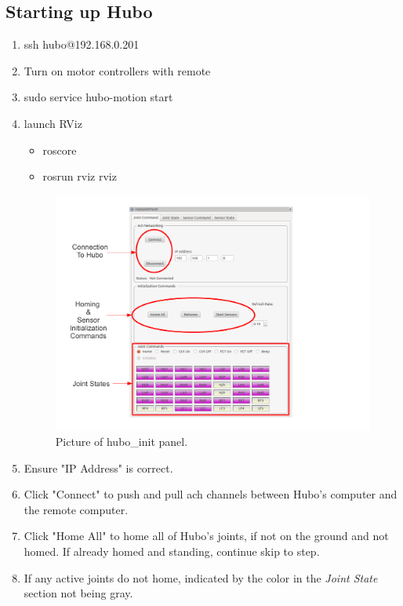 \documentclass[letterpaper, 10 pt]{report}
\begin{document}
\subsection*{Starting up Hubo}
\begin{enumerate}
  \item ssh hubo@192.168.0.201
  \item Turn on motor controllers with remote
  \item sudo service hubo-motion start
  \item launch RViz
    \begin{itemize}
    	  \item roscore
    	  \item rosrun rviz rviz
    \end{itemize}
  \begin{figure}[h]
    \centering
    \includegraphics[width=15.0cm]{resources/hubo-init.pdf}
    \caption{Picture of hubo\_init panel.}
    \label{fig:hubo-init-image}
  \end{figure}
  \item Ensure "IP Address" is correct.
  \item Click "Connect" to push and pull ach channels between Hubo's computer and the remote computer.
  \item Click "Home All" to home all of Hubo's joints, if not on the ground and not homed. If already homed and standing, continue skip to step.
  \item If any active joints do not home, indicated by the color in the \textit{Joint State} section not being gray.
\end{enumerate}

%

%

\end{document}
